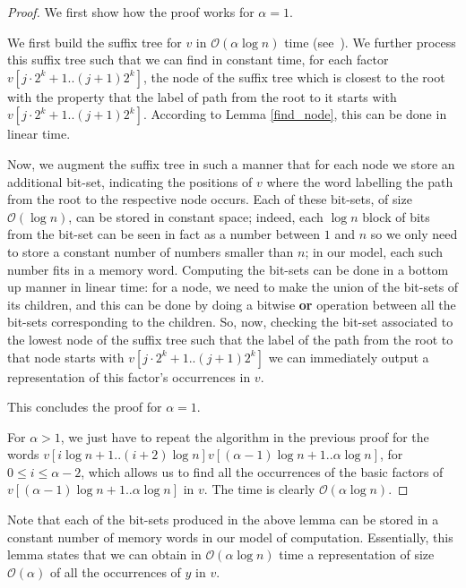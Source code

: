 \documentclass[final]{dmtcs-episciences}
\newcommand{\bigo}{{\mathcal O}}
\begin{document}
\begin{proof}
We first show how the proof works for $\alpha=1$. 

We first build the suffix tree for $v$ in $\bigo(\alpha \log n)$ time (see~\cite{Farach97}). We further process this suffix tree such that we can find in constant time, for each factor $v[j\cdot 2^k+1..(j+1)2^{k}]$, the node of the suffix tree which is closest to the root with the property that the label of path from the root to it starts with $v[j\cdot 2^k+1..(j+1)2^{k}]$. According to Lemma \ref{find_node}, this can be done in linear time. 

Now, we augment the suffix tree in such a manner that for each node we store an additional bit-set, indicating the positions of $v$ where the word labelling the path from the root to the respective node occurs. Each of these bit-sets, of size $\bigo(\log n)$, can be stored in constant space; indeed, each $\log n$ block of bits from the bit-set can be seen in fact as a number between $1$ and $n$ so we only need to store a constant number of numbers smaller than $n$; in our model, each such number fits in a memory word. Computing the bit-sets can be done in a bottom up manner in linear time: for a node, we need to make the union of the bit-sets of its children, and this can be done by doing a bitwise {\bf or} operation between all the bit-sets corresponding to the children. So, now, checking the bit-set associated to the lowest node of the suffix tree such that the label of the path from the root to that node starts with $v[j\cdot 2^k+1..(j+1)2^{k}]$ we can immediately output a representation of this factor's occurrences in $v$.

This concludes the proof for $\alpha=1$. 

For $\alpha>1$, we just have to repeat the algorithm in the previous proof for the words $v[i\log n+1..(i+2)\log n]v[(\alpha-1)\log n+1 ..\alpha\log n]$, for $0\leq i\leq \alpha-2$, which allows us to find all the occurrences of the basic factors of $v[(\alpha-1)\log n+1 ..\alpha\log n]$ in $v$. The time is clearly $\bigo(\alpha \log n)$. 

\end{proof}


Note that each of the bit-sets produced in the above lemma can be stored in a constant number of memory words in our model of computation. Essentially, this lemma states that we can obtain in $\bigo(\alpha \log n)$ time a representation of size $\bigo(\alpha)$ of all the occurrences of $y$ in $v$. 
\end{document}
